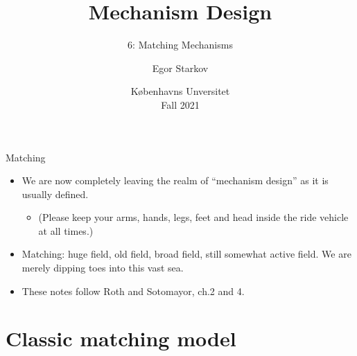 \documentclass[english,10pt
,aspectratio=169
]{beamer}
\title{Mechanism Design}
\subtitle{6: Matching Mechanisms}
\author{Egor Starkov}
\date{K{\o}benhavns Unversitet \\
	Fall 2021}
\begin{document}
	\frame[plain]{\titlepage}


\begin{frame}{Matching}
\begin{itemize}
	\item We are now completely leaving the realm of ``mechanism design'' as it is usually defined.
	\begin{itemize}
		\item (Please keep your arms, hands, legs, feet and head inside the ride vehicle at all times.)
	\end{itemize}
	\item Matching: huge field, old field, broad field, still somewhat active field. We are merely dipping toes into this vast sea.
	\item These notes follow Roth and Sotomayor, ch.2 and 4.
\end{itemize}
\end{frame}


\section{Classic matching model}
\end{document}
